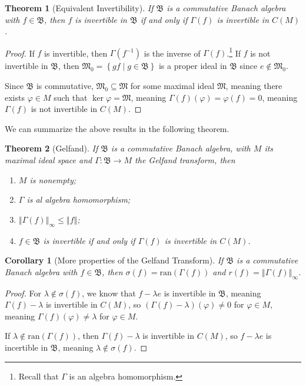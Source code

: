 \documentclass[10pt]{extarticle}
\newcommand{\norm}[1]{\left\Vert #1\right\Vert}
\newcommand{\set}[1]{\left\{#1\right\}}
\theoremstyle{plain}
\newtheorem*{theorem}{Theorem}
\newtheorem*{corollary}{Corollary}
\theoremstyle{definition}
\theoremstyle{note}
\renewcommand{\newline}{\hfill\break}
\begin{document}
\begin{theorem}[Equivalent Invertibility]
  If $\mathfrak{B}$ is a commutative Banach algebra with $f\in \mathfrak{B}$, then $f$ is invertible in $\mathfrak{B}$ if and only if $\Gamma(f)$ is invertible in $C(M)$.
\end{theorem}
\begin{proof}
  If $f$ is invertible, then $\Gamma(f^{-1})$ is the inverse of $\Gamma(f)$.\footnote{Recall that $\Gamma$ is an algebra homomorphism.} If $f$ is not invertible in $\mathfrak{B}$, then $\mathfrak{M}_0 = \set{gf\mid g\in \mathfrak{B}}$ is a proper ideal in $\mathfrak{B}$ since $e\notin \mathfrak{M}_0$.\newline

  Since $\mathfrak{B}$ is commutative, $\mathfrak{M}_0 \subseteq \mathfrak{M}$ for some maximal ideal $\mathfrak{M}$, meaning there exists $\varphi \in M$ such that $\ker\varphi = \mathfrak{M}$, meaning $\Gamma(f)(\varphi) = \varphi(f) = 0$, meaning $\Gamma(f)$ is not invertible in $C(M)$.
\end{proof}
We can summarize the above results in the following theorem.
\begin{theorem}[Gelfand]
  If $\mathfrak{B}$ is a commutative Banach algebra, with $M$ its maximal ideal space and $\Gamma: \mathfrak{B}\rightarrow M$ the Gelfand transform, then
  \begin{enumerate}[(1)]
    \item $M$ is nonempty;
    \item $\Gamma$ is al algebra homomorphism;
    \item $\norm{\Gamma(f)}_{\infty}\leq \norm{f}$;
    \item $f\in \mathfrak{B}$ is invertible if and only if $\Gamma(f)$ is invertible in $C(M)$.
  \end{enumerate}
\end{theorem}
\begin{corollary}[More properties of the Gelfand Transform]
  If $\mathfrak{B}$ is a commutative Banach algebra with $f\in \mathfrak{B}$, then $\sigma(f) = \text{ran}\left(\Gamma(f)\right)$ and $r(f) = \norm{\Gamma(f)}_{\infty}$.
\end{corollary}
\begin{proof}
  For $\lambda \notin \sigma(f)$, we know that $f-\lambda e$ is invertible in $\mathfrak{B}$, meaning $\Gamma(f) -\lambda$ is invertible in $C(M)$, so $\left(\Gamma(f)-\lambda\right)\left(\varphi\right) \neq 0$ for $\varphi \in M$, meaning $\Gamma(f)(\varphi)\neq \lambda$ for $\varphi \in M$.\newline

  If $\lambda \notin \text{ran}\left(\Gamma(f)\right)$, then $\Gamma(f)-\lambda$ is invertible in $C(M)$, so $f - \lambda e$ is incertible in $\mathfrak{B}$, meaning $\lambda \notin \sigma(f)$.
\end{proof}
\end{document}
